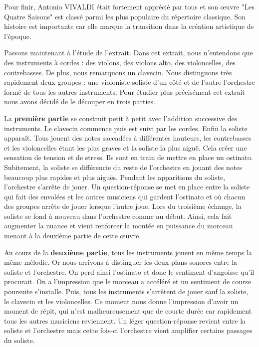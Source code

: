 \documentclass[12pt]{article}
\begin{document}
Pour finir, Antonio VIVALDI était fortement apprécié par tous et son œuvre "Les Quatre Saisons" est classé parmi les 
plus populaire du répertoire classique. Son histoire est importante car elle marque la transition dans la création artistique de l’époque.

\vspace{0.3cm}

Passons maintenant à l’étude de l’extrait.
Dans cet extrait, nous n’entendons que des instruments à cordes : des violons, des violons alto, des violoncelles, des contrebasses. De plus, nous remarquons un clavecin. Nous distinguons très rapidement deux groupes : une violoniste soliste d’un côté et de l’autre l’orchestre formé de tous les autres instruments. Pour étudier plus précisément cet extrait nous avons décidé de le découper en trois parties.

La \textbf{première partie} se construit petit à petit avec l’addition successive des instruments. Le clavecin commence puis est suivi par les cordes. Enfin la soliste apparaît. Tous jouent des notes saccadées à différentes hauteurs, les contrebasses et les violoncelles étant les plus graves et la soliste la plus aiguë. Cela créer une sensation de tension et de stress. Ils sont en train de mettre en place un ostinato. 
Subitement, la soliste se différencie du reste de l'orchestre en jouant des notes beaucoup plus rapides et plus aiguës. Pendant les apparitions du soliste, l’orchestre s’arrête de jouer. Un question-réponse se met en place entre la soliste qui fait des envolées et les autres musiciens qui gardent l’ostinato et où chacun des groupes arrête de jouer lorsque l’autre joue. Lors du troisième échange, la soliste se fond à nouveau dans l’orchestre comme au début. Ainsi, cela fait augmenter la nuance et vient renforcer la montée en puissance du morceau menant à la deuxième partie de cette œuvre.

Au cours de la \textbf{deuxième partie}, tous les instruments jouent en même temps la même mélodie. Or nous arrivons à distinguer les deux plans sonores entre la soliste et l’orchestre. On perd ainsi l’ostinato et donc le sentiment d’angoisse qu’il procurait. On a l’impression que le morceau a accéléré et un sentiment de course poursuite s’installe. Puis, tous les instruments s’arrêtent de jouer sauf la soliste, le clavecin et les violoncelles. Ce moment nous donne l’impression d’avoir un moment de répit, qui n’est malheureusement que de courte durée car rapidement tous les autres musiciens reviennent. Un léger question-réponse revient entre la soliste et l’orchestre mais cette fois-ci l’orchestre vient amplifier certains passages du soliste.
\end{document}
